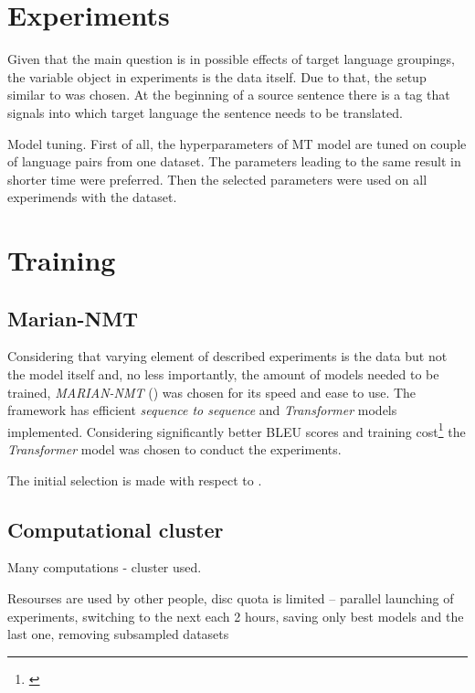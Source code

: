 \section{Experiments}


Given that the main question is in possible effects of target language groupings, the variable object in experiments is the data itself. Due to that, the setup similar to \cite{johnson-etal-2017-googles} was chosen. At the beginning of a source sentence there is a tag that signals into which target language the sentence needs to be translated. 


Model tuning. First of all, the hyperparameters of MT model are tuned on couple of language pairs from one dataset. The parameters leading to the same result in shorter time were preferred. Then the selected parameters were used on all experimends with the dataset.


\section{Training}

\subsection{Marian-NMT}

Considering that varying element of described experiments is the data but not the model itself and, no less importantly, the amount of models needed to be trained, \textit{MARIAN-NMT} (\cite{mariannmt}) was chosen for its speed and ease to use.
The framework has efficient \textit{sequence to sequence} and \textit{Transformer} models implemented. Considering significantly better BLEU scores and training cost\footnote{\cite{attention-is-all-you-need}} the \textit{Transformer} model was chosen to conduct the experiments.

The initial selection is made with respect to \cite{training-tips}.

\subsection{Computational cluster}

Many computations - cluster used.

Resourses are used by other people, disc quota is limited -- 
parallel launching of experiments, 
switching to the next each 2 hours, 
saving only best models and the last one,
removing subsampled datasets

